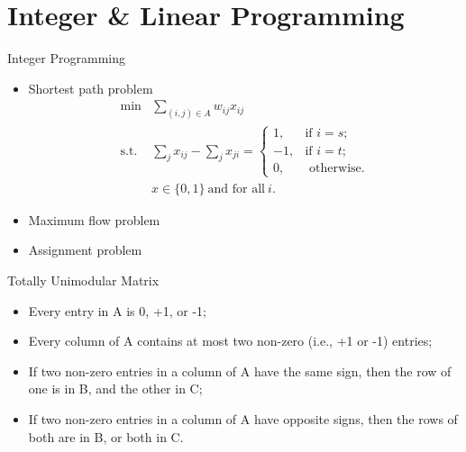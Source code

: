 \section{Integer \& Linear Programming}

    \frame{\sectionpage}

    \begin{frame}{Integer Programming}
        \begin{itemize}
          \item<+-> Shortest path problem
          \begin{equation*}
            \begin{align}
            \min& \sum_{(i,j)\in A}w_{ij}x_{ij}\\
            \text{s.t.} &\sum_{j}x_{ij}-\sum_{j}x_{ji}={\begin{cases}1,&{\text{if }}i=s;\\-1,&{\text{if }}i=t;\\0,&{\text{ otherwise.}}\end{cases}}\\
            & x\in \{0,1\} ~\text{and for all} ~i.
            \end{align}
          \end{equation*}
          \item<+-> Maximum flow problem
          \item<+-> Assignment problem
        \end{itemize}
    \end{frame}

    \begin{frame}{Totally Unimodular Matrix}
      \begin{spacing}{1.5}
        \begin{itemize}
          \item Every entry in A is 0, +1, or -1;
          \item Every column of A contains at most two non-zero (i.e., +1 or -1) entries;
          \item If two non-zero entries in a column of A have the same sign, then the row of one is in B, and the other in C;
          \item If two non-zero entries in a column of A have opposite signs, then the rows of both are in B, or both in C.
        \end{itemize}
      \end{spacing}
    \end{frame}

